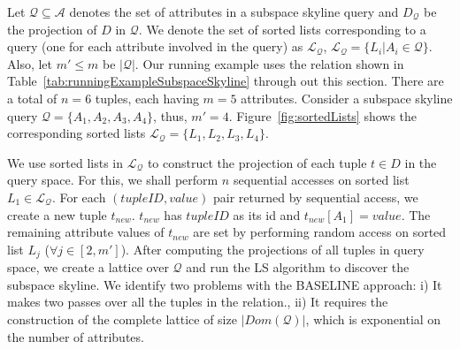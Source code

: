 \begin{exmp}\label{exmp:subspaceSkyline}
Let $\mathcal{Q} \subseteq \mathcal{A}$ denotes the set of attributes in a subspace skyline query and $D_{\mathcal{Q}}$ be the projection of $D$ in $\mathcal{Q}$. We denote the set of sorted lists corresponding to a query (one for each attribute involved in the query) as $\mathcal{L_Q}$, $\mathcal{L_Q} = \{ L_i | A_i \in \mathcal{Q} \}$. Also, let $m' \leq m$ be $|\mathcal{Q}|$. Our running example uses the relation shown in Table~\ref{tab:runningExampleSubspaceSkyline} through out this section. There are a
total of  $n=6$ tuples, each having $m=5$ attributes. Consider a subspace skyline query $\mathcal{Q} = \{A_1, A_2, A_3, A_4\}$, thus, $m' = 4$. Figure~\ref{fig:sortedLists} shows the corresponding sorted lists $\mathcal{L_Q} = \{L_1, L_2, L_3, L_4 \}$.
\end{exmp}

\vspace{1mm}
 We use sorted lists in $\mathcal{L_Q}$ to construct the projection of each tuple $t \in D$ in the query space. For this, we shall perform $n$ sequential accesses on sorted list $L_1 \in \mathcal{L_Q}$. For each $(tupleID, value)$ pair returned by sequential access, we create a new tuple $t_{new}$. $t_{new}$ has $tupleID$ as its id and $t_{new}[A_1] = value$. The remaining attribute values of $t_{new}$ are set by performing random access on sorted list $L_j$ ($\forall j \in [2,m']$). After computing the projections of all tuples in query space, we create a lattice over $\mathcal{Q}$ and 
run the LS algorithm to discover the subspace skyline. We identify two problems with the BASELINE approach: i) It makes two passes over all the tuples in the relation., ii) It requires the construction of the complete lattice of size $|Dom(\mathcal{Q})|$, which is exponential on the number of attributes.




